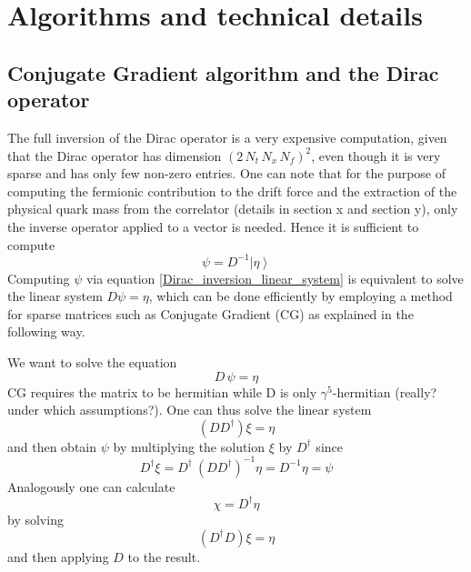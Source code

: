 \chapter{Algorithms and technical details}
\label{chap:AppendixC}

\section{Conjugate Gradient algorithm and the Dirac operator}
The full inversion of the Dirac operator is a very expensive computation, given that the Dirac operator has dimension $(2 \, N_t \, N_x \, N_f)^2$, even though it is very sparse and has only few non-zero entries. One can note that for the purpose of computing the fermionic contribution to the drift force and the extraction of the physical quark mass from the correlator (details in section x and section y), only the inverse operator applied to a vector is needed. Hence it is sufficient to compute 
\begin{equation}
    \psi = D^{-1} \left| \eta \right\rangle
    \label{Dirac_inversion_linear_system}
\end{equation}
Computing $\psi$ via equation \eqref{Dirac_inversion_linear_system} is equivalent to solve the linear system $D \psi = \eta$, which can be done efficiently by employing a method for sparse matrices such as Conjugate Gradient (CG) as explained in the following way.

We want to solve the equation
\begin{equation*} 
    D \, \psi = \eta
\end{equation*}
CG requires the matrix to be hermitian while D is only $\gamma^5$-hermitian (really? under which assumptions?). One can thus solve the linear system
\begin{equation*}
    \left(D D^{\dagger} \right) \xi = \eta
\end{equation*}
and then obtain $\psi$ by multiplying the solution $\xi$ by $D^{\dagger}$ since 
\begin{equation}
    D^{\dagger} \xi = D^{\dagger} \ \left(D D^{\dagger}\right)^{-1} \eta = D^{-1} \eta = \psi
\end{equation}
Analogously one can calculate
\begin{equation*}
    \chi = D^{\dagger} \eta
\end{equation*}
by solving
\begin{equation*}
    \left(D^{\dagger} D\right) \xi = \eta
\end{equation*}
and then applying $D$ to the result.

